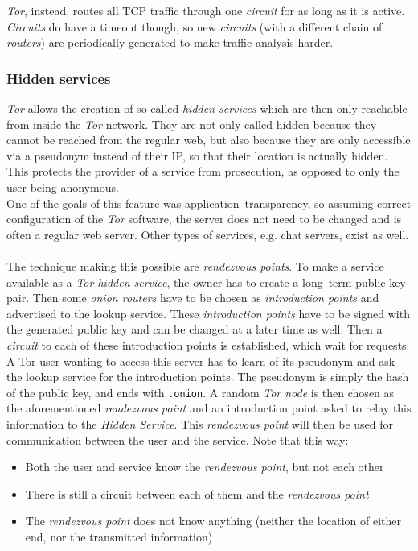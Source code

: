 \documentclass{sig-alternate}
\begin{document}
\emph{Tor}, instead, routes all TCP traffic through one \emph{circuit} for as long as it is active.
\emph{Circuits} do have a timeout though, so new \emph{circuits} (with a different chain of \emph{routers})
are periodically generated to make traffic analysis harder.

\subsubsection{Hidden services}
\emph{Tor} allows the creation of so-called \emph{hidden services} which are then only reachable from inside
the \emph{Tor} network.
They are not only called hidden because they cannot be reached from the regular web, but also because they
are only accessible via a pseudonym instead of their IP, so that their location is actually hidden.
This protects the provider of a service from prosecution, as opposed to only the user being anonymous\cite{biryukov2013}.
\\
One of the goals of this feature was application--transparency, so assuming correct configuration of the
\emph{Tor} software, the server does not need to be changed and is often a regular web
server\cite{tor2004}.
Other types of services, e.g. chat servers, exist as well\cite{biryukov2013}.
\\
\\
The technique making this possible are \emph{rendezvous points}.
To make a service available as a \emph{Tor hidden service}, the owner has to create a long--term public key pair.
Then some \emph{onion routers} have to be chosen as \emph{introduction points} and advertised to the lookup service.
These \emph{introduction points} have to be signed with the generated public key and can be changed at a later time as well.
Then a \emph{circuit} to each of these introduction points is established, which wait for requests.
\\
A Tor user wanting to access this server has to learn of its pseudonym and ask the lookup service for the introduction points.
The pseudonym is simply the hash of the public key, and ends with \texttt{.onion}.
A random \emph{Tor node} is then chosen as the aforementioned \emph{rendezvous point} and an introduction point asked to relay this information to the \emph{Hidden Service}.
This \emph{rendezvous point} will then be used for communication between the user and the service.
Note that this way:
\begin{itemize}
\item{Both the user and service know the \emph{rendezvous point}, but not each other}
\item{There is still a circuit between each of them and the \emph{rendezvous point}}
\item{The \emph{rendezvous point} does not know anything (neither the location of either end, nor the transmitted information)}
\end{itemize}
\cite{syverson2006}
\end{document}
